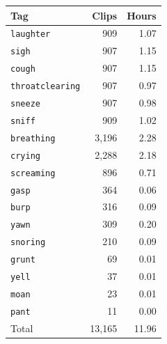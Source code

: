 \small
\begin{tabular}{lrr}
\toprule
Tag & Clips & Hours \\
\midrule
\texttt{laughter}       & 909    & 1.07 \\
\texttt{sigh}           & 907    & 1.15 \\
\texttt{cough}          & 907    & 1.15 \\
\texttt{throatclearing} & 907    & 0.97 \\
\texttt{sneeze}         & 907    & 0.98 \\
\texttt{sniff}          & 909    & 1.02 \\
\midrule
\texttt{breathing}      & 3,196  & 2.28 \\
\texttt{crying}         & 2,288  & 2.18 \\
\texttt{screaming}      & 896    & 0.71 \\
\texttt{gasp}           & 364    & 0.06 \\
\texttt{burp}           & 316    & 0.09 \\
\texttt{yawn}           & 309    & 0.20 \\
\texttt{snoring}        & 210    & 0.09 \\
\texttt{grunt}          & 69     & 0.01 \\
\texttt{yell}           & 37     & 0.01 \\
\texttt{moan}           & 23     & 0.01 \\
\texttt{pant}           & 11     & 0.00 \\
\midrule
Total                   & 13,165 & 11.96 \\
\bottomrule
\end{tabular}

